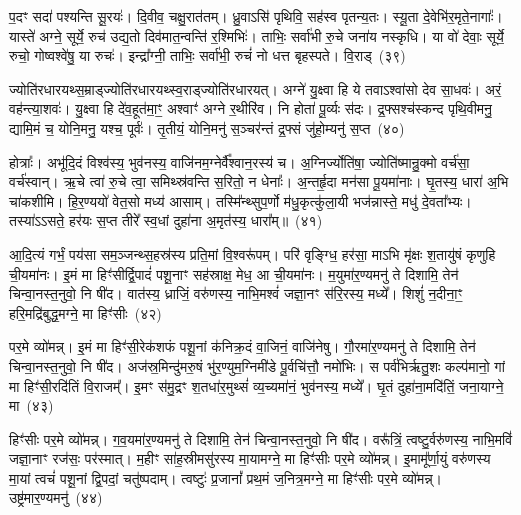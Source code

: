 प॒दꣳ सदा॑ पश्यन्ति सू॒रयः॑। दि॒वीव॒ चक्षु॒रात॑तम्। ध्रु॒वाऽसि॑ पृथिवि॒ सह॑स्व पृतन्य॒तः। स्यू॒ता दे॒वेभि॑र॒मृते॒नागाः᳚। यास्ते॑ अग्ने॒ सूर्ये॒ रुच॑ उद्य॒तो दिव॑मात॒न्वन्ति॑ र॒श्मिभिः॑। ताभिः॒ सर्वा॑भी रु॒चे जना॑य नस्कृधि। या वो॑ देवाः॒ सूर्ये॒ रुचो॒ गोष्वश्वे॑षु॒ या रुचः॑। इन्द्रा᳚ग्नी॒ ताभिः॒ सर्वा॑भी॒ रुचं॑ नो धत्त बृहस्पते। वि॒राड्~(३९)\ip

ज्योति॑रधारयथ्स॒म्राड्ज्योति॑रधारयथ्स्व॒राड्ज्योति॑रधारयत्। अग्ने॑ यु॒क्ष्वा हि ये तवा\-ऽ\-श्वा॑सो देव सा॒धवः॑। अरं॒ वह॑न्त्या॒शवः॑। यु॒क्ष्वा हि दे॑व॒हूत॑मा॒ꣳ॒ अश्वाꣳ॑ अग्ने र॒थीरि॑व। नि होता॑ पू॒र्व्यः स॑दः। द्र॒फ्सश्च॑स्कन्द पृथि॒वीमनु॒ द्यामि॒मं च॒ योनि॒मनु॒ यश्च॒ पूर्वः॑। तृ॒तीयं॒ योनि॒मनु॑ स॒ञ्चर॑न्तं द्र॒फ्सं जु॑हो॒म्यनु॑ स॒प्त~(४०)\ip

होत्राः᳚। अभू॑दि॒दं विश्व॑स्य॒ भुव॑नस्य॒ वाजि॑नम॒ग्नेर्वै᳚श्वान॒रस्य॑ च। अ॒ग्निर्ज्योति॑षा॒ ज्योति॑ष्मान्रु॒क्मो वर्च॑सा॒ वर्च॑स्वान्। ऋ॒चे त्वा॑ रु॒चे त्वा॒ समिथ्स्र॑वन्ति स॒रितो॒ न धेनाः᳚। अ॒न्तर्\mbox{}हृ॒दा मन॑सा पू॒यमा॑नाः। घृ॒तस्य॒ धारा॑ अ॒भि चा॑कशीमि। हि॒र॒ण्ययो॑ वेत॒सो मध्य॑ आसाम्। तस्मि᳚न्थ्सुप॒र्णो म॑धु॒कृत्कु॑ला॒यी भज॑न्नास्ते॒ मधु॑ दे॒वता᳚भ्यः। तस्या॑\-ऽऽसते॒ हर॑यः स॒प्त तीरे᳚ स्व॒धां दुहा॑ना अ॒मृत॑स्य॒ धारा᳚म्॥~(४१)\ip

{\anuvakamend[{प्र॒ति॒ष्ठायै॑ स॒हस्र॑वीर्या पर॒मं वि॒राट्थ्स॒प्त तीरे॑ च॒त्वारि॑ च}]}

आ॒दि॒त्यं गर्भं॒ पय॑सा सम॒ञ्जन्थ्स॒हस्र॑स्य प्रति॒मां वि॒श्वरू॑पम्। परि॑ वृङ्ग्धि॒ हर॑सा॒ माऽभि मृ॑क्षः श॒तायु॑षं कृणुहि ची॒यमा॑नः। इ॒मं मा हिꣳ॑सीर्द्वि॒पादं॑ पशू॒नाꣳ सह॑स्राक्ष॒ मेध॒ आ ची॒यमा॑नः। म॒युमा॑र॒ण्यमनु॑ ते दिशामि॒ तेन॑ चिन्वा॒नस्त॒नुवो॒ नि षी॑द। वात॑स्य॒ ध्राजिं॒ वरु॑णस्य॒ नाभि॒मश्वं॑ जज्ञा॒नꣳ स॑रि॒रस्य॒ मध्ये᳚। शिशुं॑ न॒दीना॒ꣳ॒ हरि॒मद्रि॑बुद्ध॒मग्ने॒ मा हिꣳ॑सीः~(४२)\ip

पर॒मे व्यो॑मन्न्। इ॒मं मा हिꣳ॑सी॒रेक॑शफं पशू॒नां क॑निक्र॒दं वा॒जिनं॒ वाजि॑नेषु। गौ॒रमा॑र॒ण्यमनु॑ ते दिशामि॒ तेन॑ चिन्वा॒नस्त॒नुवो॒ नि षी॑द। अज॑स्र॒मिन्दु॑मरु॒षं भु॑र॒ण्युम॒ग्निमी॑डे पू॒र्वचि॑त्तौ॒ नमो॑भिः। स पर्व॑भिर्\mbox{}ऋतु॒शः कल्प॑मानो॒ गां मा हिꣳ॑सी॒रदि॑तिं वि॒राजम्᳚। इ॒मꣳ स॑मु॒द्रꣳ श॒तधा॑र॒मुथ्सं॑ व्य॒च्यमा॑नं॒ भुव॑नस्य॒ मध्ये᳚। घृ॒तं दुहा॑ना॒मदि॑तिं॒ जना॒याग्ने॒ मा~(४३)\ip

हिꣳ॑सीः पर॒मे व्यो॑मन्न्। ग॒व॒यमा॑र॒ण्यमनु॑ ते दिशामि॒ तेन॑ चिन्वा॒नस्त॒नुवो॒ नि षी॑द। वरू᳚त्रिं॒ त्वष्टु॒र्वरु॑णस्य॒ नाभि॒मविं॑ जज्ञा॒नाꣳ रज॑सः॒ पर॑स्मात्। म॒हीꣳ सा॑ह॒स्रीमसु॑रस्य मा॒यामग्ने॒ मा हिꣳ॑सीः पर॒मे व्यो॑मन्न्। इ॒मामू᳚र्णा॒युं वरु॑णस्य मा॒यां त्वचं॑ पशू॒नां द्वि॒पदां॒ चतु॑ष्पदाम्। त्वष्टुः॑ प्र॒जानां᳚ प्रथ॒मं ज॒नित्र॒मग्ने॒ मा हिꣳ॑सीः पर॒मे व्यो॑मन्न्। उष्ट्र॑मार॒ण्यमनु॑~(४४)\ip

